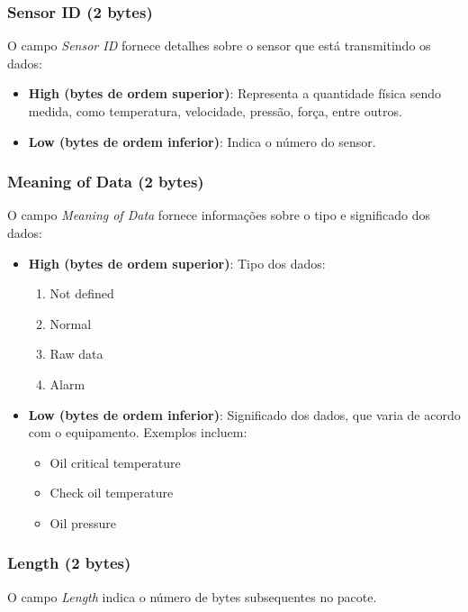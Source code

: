\subsubsection{Sensor ID (2 bytes)}

O campo \textit{Sensor ID} fornece detalhes sobre o sensor que está transmitindo os dados:

\begin{itemize}
    \item \textbf{High (bytes de ordem superior)}: Representa a quantidade física sendo medida, como temperatura, velocidade, pressão, força, entre outros.
    \item \textbf{Low (bytes de ordem inferior)}: Indica o número do sensor.
\end{itemize}

\subsubsection{Meaning of Data (2 bytes)}

O campo \textit{Meaning of Data} fornece informações sobre o tipo e significado dos dados:

\begin{itemize}
    \item \textbf{High (bytes de ordem superior)}: Tipo dos dados:
    \begin{enumerate}
        \item Not defined
        \item Normal
        \item Raw data
        \item Alarm
    \end{enumerate}
    \item \textbf{Low (bytes de ordem inferior)}: Significado dos dados, que varia de acordo com o equipamento. Exemplos incluem:
    \begin{itemize}
        \item Oil critical temperature
        \item Check oil temperature
        \item Oil pressure
    \end{itemize}
\end{itemize}

\subsubsection{Length (2 bytes)}

O campo \textit{Length} indica o número de bytes subsequentes no pacote.

